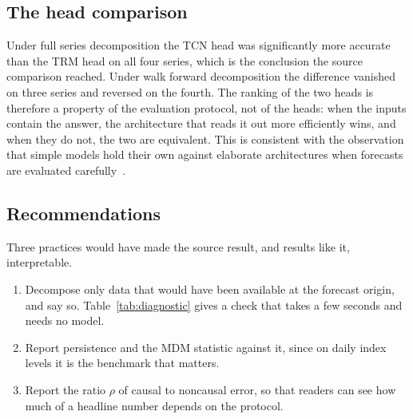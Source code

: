 \subsection{The head comparison}
Under full series decomposition the TCN head was significantly more accurate
than the TRM head on all four series, which is the conclusion the source
comparison reached. Under walk forward decomposition the difference vanished
on three series and reversed on the fourth. The ranking of the two heads is
therefore a property of the evaluation protocol, not of the heads: when the
inputs contain the answer, the architecture that reads it out more efficiently
wins, and when they do not, the two are equivalent. This is consistent with the
observation that simple models hold their own against elaborate architectures
when forecasts are evaluated carefully~\cite{zeng2023,hewamalage2022}.

\subsection{Recommendations}
Three practices would have made the source result, and results like it,
interpretable.
\begin{enumerate}
\item Decompose only data that would have been available at the forecast
origin, and say so. Table~\ref{tab:diagnostic} gives a check that takes a few
seconds and needs no model.
\item Report persistence and the MDM statistic against it, since on daily
index levels it is the benchmark that matters.
\item Report the ratio $\rho$ of causal to noncausal error, so that readers
can see how much of a headline number depends on the protocol.
\end{enumerate}

